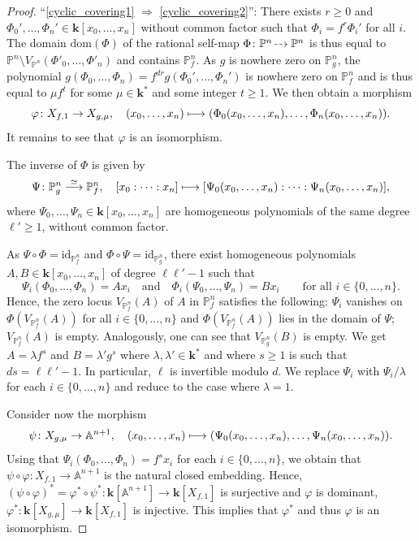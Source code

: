 \documentclass[JEP,XML,SOM,Unicode,NoFloatCountersInSection,published]{cedram}
\newcommand\mto{\mathchoice{\longmapsto}{\mapsto}{\mapsto}{\mapsto}}
\newcommand\quand{\quad\text{and}\quad}
\newcommand{\dradpl}{{\hspace*{-2.5mm}\begin{tikzcd}[ampersand replacement=\&,column sep = scriptsize]\mbox{}\ar[r,dashed]\&\mbox{}\end{tikzcd}\hspace*{-2.5mm}}}
\newcommand{\dratst}{{\hspace*{-2.5mm}\begin{tikzcd}[ampersand replacement=\&,column sep = small]\mbox{}\ar[r,dashed]\&\mbox{}\end{tikzcd}\hspace*{-2mm}}}
\let\drascst\dratst
\newcommand{\dra}{\mathchoice{\dradpl}{\dratst}{\drascst}{\drascst}}
\theoremstyle{definition}
\newcommand\iso{\stackrel{\simeq}{\longrightarrow}}
\newcommand\A{{\mathbb A}}\let\AA\A
\renewcommand\k{{\mathbf k}}
\newcommand\p{{\mathbb P}}\let\PP\p
\newcommand{\kk}{\mathbf{k}}
\let\rat\dra
\begin{document}
\begin{proof}
``\eqref{cyclic_covering1} $\Rightarrow$ \eqref{cyclic_covering2}'':
There exists $r \geq 0$ and $\Phi_0', \ldots, \Phi_n'\in\kk[x_0, \ldots, x_n]$
without common factor such that
$\Phi_i = f^r \Phi_i'$ for all $i$. The domain $\textrm{dom}(\Phi)$ of the rational self-map $\Phi \colon \PP^n \rat \PP^n$
is thus equal to
$\PP^n \setminus V_{\PP^n}(\Phi'_0, \ldots, \Phi'_n)$ and contains $\PP^n_f$.
As $g$ is nowhere zero on $\p^n_g$, the polynomial $g(\Phi_0,\ldots,\Phi_n) = f^{dr} g(\Phi_0', \ldots, \Phi_n')$ is nowhere zero on $\p^n_f$ and is thus equal to $\mu f^t$ for some $\mu\in \k^*$ and some integer $t\ge 1$. We then obtain a morphism
\[
\varphi\colon X_{f,1} \to X_{g,\mu}, \quad
(x_0,\ldots,x_n)\mto (\Phi_0(x_0,\ldots,x_n),\ldots, \Phi_n(x_0,\ldots,x_n)).
\]
It remains to see that $\varphi$ is an isomorphism.

The inverse of $\Phi$ is given by
\[
\Psi\colon \p^n_g\iso \p^n_f, \quad [x_0:\cdots:x_n]\mto [\Psi_0(x_0,\ldots,x_n):\cdots: \Psi_n(x_0,\ldots,x_n)],
\]
where $\Psi_0,\ldots,\Psi_n\in \k[x_0,\ldots,x_n]$ are homogeneous polynomials of the same degree $\ell'\ge 1$, without common factor.

As $\Psi\circ \Phi=\mathrm{id}_{\p^n_f}$ and $\Phi\circ \Psi=\mathrm{id}_{\p^n_g}$, there exist homogeneous polynomials $A,B\in \k[x_0,\ldots,x_n]$ of degree $\ell\ell'-1$ such that
\[\Psi_i(\Phi_0,\ldots,\Phi_n)= Ax_i \quand\Phi_i(\Psi_0,\ldots,\Psi_n)= Bx_i \qquad\text{for all }i\in \{0,\ldots,n\}.\]
Hence, the zero locus $V_{\PP^n_f}(A)$ of $A$ in $\PP^n_f$ satisfies the following: $\Psi_i$ vanishes on $\Phi(V_{\PP^n_f}(A))$ for all
$i \in \{0, \ldots, n\}$
and $\Phi(V_{\PP^n_f}(A))$ lies in the domain of $\Psi$; \ie $V_{\PP^n_f}(A)$
is empty. Analogously, one can see that $V_{\PP^n_g}(B)$ is empty.
We get $A=\lambda f^s$ and $B=\lambda' g^{s}$ where $\lambda,\lambda'\in \k^*$ and where $s\ge 1$ is such that $ds=\ell\ell'-1$. In particular, $\ell$ is invertible modulo $d$.
We replace $\Psi_i$ with $\Psi_i/\lambda$ for each $i\in \{0,\ldots,n\}$ and reduce to the case where $\lambda=1$.

Consider now the morphism
\[
\psi\colon X_{g,\mu} \to \A^{n+1}, \quad
(x_0,\ldots,x_n)\mto (\Psi_0(x_0,\ldots,x_n),\ldots, \Psi_n(x_0,\ldots,x_n)).
\]
Using that $\Psi_i(\Phi_0,\ldots,\Phi_n)= f^sx_i$ for each $i\in \{0,\ldots,n\}$, we obtain that
$\psi\circ \varphi \colon X_{f, 1} \to \AA^{n+1}$ is the natural closed embedding.
Hence, $(\psi \circ \varphi)^\ast = \varphi^\ast \circ \psi^\ast \colon \kk[\AA^{n+1}] \to \kk[X_{f, 1}]$ is surjective and $\varphi$ is dominant, \ie $\varphi^\ast \colon \kk[X_{g, \mu}] \to \kk[X_{f, 1}]$ is injective.
This implies that
$\varphi^\ast$ and thus $\varphi$ is an isomorphism.


\end{proof}
\end{document}
